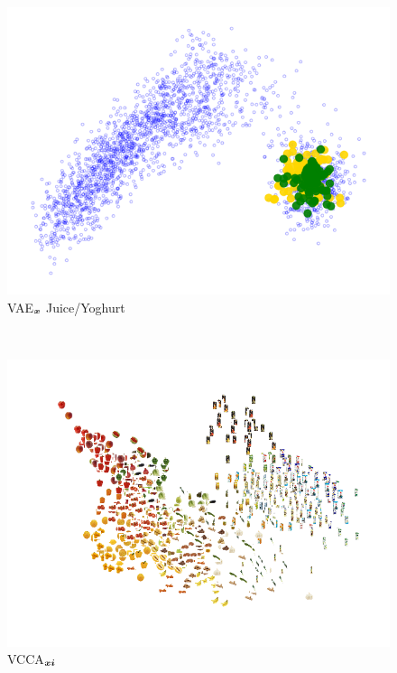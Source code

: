 \begin{subfigure}[b]{0.3\textwidth}
	\centering
	\includegraphics[width=\textwidth]{Chapter1/pics_paperB/pca_latents_juice_yoghurt_vae_seed2}
	\caption{VAE$_{{\bm{x}}}$ Juice/Yoghurt}
	\label{fig:pca_latents_vae_juice_yoghurt}
\end{subfigure} \\
\begin{subfigure}[b]{0.3\textwidth}
	\centering
	\includegraphics[width=\textwidth]{Chapter1/pics_paperB/pca_latents_vcca_xi_seed2}
	\caption{VCCA$_{{\bm{x}}{\bm{i}}}$}
	\label{fig:pca_latents_vcca_xi}
\end{subfigure}
\hfill

